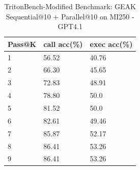 \begin{table}
 \caption{TritonBench-Modified Benchmark: GEAK Sequential@10 + Parallel@10 on MI250 - GPT4.1}
  \centering
  \begin{tabular}{lll}
    \toprule
    Pass@K & call acc(\%) & exec acc(\%) \\
       \midrule
    1 & 56.52 & 40.76 \\
    2 & 66.30 & 45.65 \\
    3 & 72.83 & 48.91 \\
    4 & 78.80 & 50.0 \\
    5 & 81.52 & 50.0 \\
    6 & 82.61 & 49.46 \\
    7 & 85.87 & 52.17 \\
    8 & 86.41 & 53.26 \\
    9 & 86.41 & 53.26 \\
   
    \bottomrule
  \end{tabular}
  \label{tab:parallel_scaling_tritonbench_mi250}
\end{table}